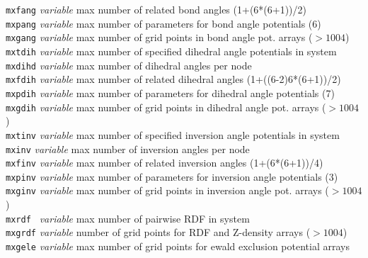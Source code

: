 \begin{tabbing}
\> {\tt mxfang}      \> {\em variable}       \> max number of related bond angles (1+(6*(6+1))/2) \\
\> {\tt mxpang}      \> {\em variable}       \> max number of parameters for bond angle potentials (6) \\
\> {\tt mxgang}      \> {\em variable}       \> max number of grid points in bond angle pot. arrays ($> 1004$) \\
\> {\tt mxtdih}      \> {\em variable}       \> max number of specified dihedral angle potentials in system \\
\> {\tt mxdihd}      \> {\em variable}       \> max number of dihedral angles per node \\
\> {\tt mxfdih}      \> {\em variable}       \> max number of related dihedral angles (1+((6-2)6*(6+1))/2) \\
\> {\tt mxpdih}      \> {\em variable}       \> max number of parameters for dihedral angle potentials (7) \\
\> {\tt mxgdih}      \> {\em variable}       \> max number of grid points in dihedral angle pot. arrays ($> 1004$) \\
\> {\tt mxtinv}      \> {\em variable}       \> max number of specified inversion angle potentials in system \\
\> {\tt mxinv}       \> {\em variable}       \> max number of inversion angles per node \\
\> {\tt mxfinv}      \> {\em variable}       \> max number of related inversion angles (1+(6*(6+1))/4) \\
\> {\tt mxpinv}      \> {\em variable}       \> max number of parameters for inversion angle potentials (3) \\
\> {\tt mxginv}      \> {\em variable}       \> max number of grid points in inversion angle pot. arrays ($> 1004$) \\
\> {\tt mxrdf }      \> {\em variable}       \> max number of pairwise RDF in system \\
\> {\tt mxgrdf}      \> {\em variable}       \> number of grid points for RDF and Z-density arrays ($> 1004$)\\
\> {\tt mxgele}      \> {\em variable}       \> max number of grid points for ewald exclusion potential arrays \\


\end{tabbing}
